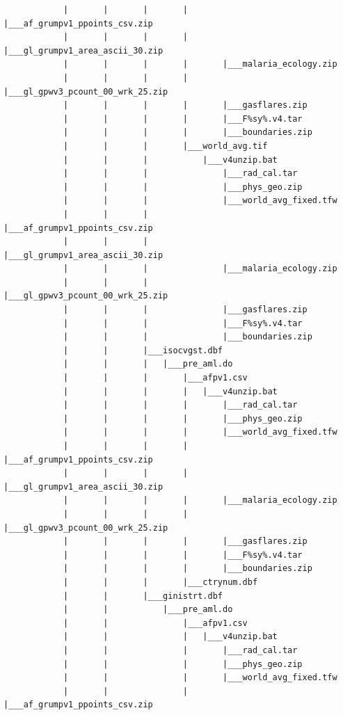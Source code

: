 \documentclass[]{book}
\begin{document}
\begin{verbatim}
            |       |       |       |       |___af_grumpv1_ppoints_csv.zip
            |       |       |       |       |___gl_grumpv1_area_ascii_30.zip
            |       |       |       |       |___malaria_ecology.zip
            |       |       |       |       |___gl_gpwv3_pcount_00_wrk_25.zip
            |       |       |       |       |___gasflares.zip
            |       |       |       |       |___F%sy%.v4.tar
            |       |       |       |       |___boundaries.zip
            |       |       |       |___world_avg.tif
            |       |       |           |___v4unzip.bat
            |       |       |               |___rad_cal.tar
            |       |       |               |___phys_geo.zip
            |       |       |               |___world_avg_fixed.tfw
            |       |       |               |___af_grumpv1_ppoints_csv.zip
            |       |       |               |___gl_grumpv1_area_ascii_30.zip
            |       |       |               |___malaria_ecology.zip
            |       |       |               |___gl_gpwv3_pcount_00_wrk_25.zip
            |       |       |               |___gasflares.zip
            |       |       |               |___F%sy%.v4.tar
            |       |       |               |___boundaries.zip
            |       |       |___isocvgst.dbf
            |       |       |   |___pre_aml.do
            |       |       |       |___afpv1.csv
            |       |       |       |   |___v4unzip.bat
            |       |       |       |       |___rad_cal.tar
            |       |       |       |       |___phys_geo.zip
            |       |       |       |       |___world_avg_fixed.tfw
            |       |       |       |       |___af_grumpv1_ppoints_csv.zip
            |       |       |       |       |___gl_grumpv1_area_ascii_30.zip
            |       |       |       |       |___malaria_ecology.zip
            |       |       |       |       |___gl_gpwv3_pcount_00_wrk_25.zip
            |       |       |       |       |___gasflares.zip
            |       |       |       |       |___F%sy%.v4.tar
            |       |       |       |       |___boundaries.zip
            |       |       |       |___ctrynum.dbf
            |       |       |___ginistrt.dbf
            |       |           |___pre_aml.do
            |       |               |___afpv1.csv
            |       |               |   |___v4unzip.bat
            |       |               |       |___rad_cal.tar
            |       |               |       |___phys_geo.zip
            |       |               |       |___world_avg_fixed.tfw
            |       |               |       |___af_grumpv1_ppoints_csv.zip

\end{verbatim}
\end{document}
